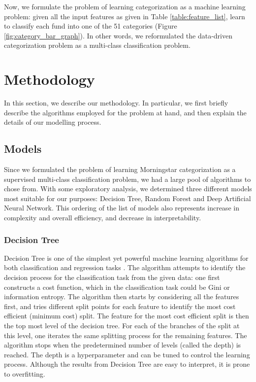 \documentclass[sigconf]{acmart}
\begin{document}
Now, we formulate the problem of learning categorization as a machine learning problem: given all the input features as given in Table \ref{table:feature_list}, learn to classify each fund into one of the 51 categories (Figure \ref{fig:category_bar_graph}). In other words, we reformulated the data-driven categorization problem as a multi-class classification problem.

\section{Methodology}
In this section, we describe our methodology. In particular, we first briefly describe the algorithms employed for the problem at hand, and then explain the details of our modelling process. 
\subsection{Models}
Since we formulated the problem of learning Morningstar categorization as a supervised multi-class classification problem, we had a large pool of algorithms to chose from. With some exploratory analysis, we determined three different models most suitable for our purposes: Decision Tree, Random Forest and Deep Artificial Neural Network. This ordering of the list of models also represents increase in complexity and overall efficiency, and decrease in interpretability.

\subsubsection{Decision Tree}
Decision Tree is one of the simplest yet powerful machine learning algorithms for both classification and regression tasks \cite{hastie2009elements}. The algorithm attempts to identify the decision process for the classification task from the given data: one first constructs a cost function, which in the classification task could be Gini or information entropy. The algorithm then starts by considering all the features first, and tries different split points for each feature to identify the most cost efficient (minimum cost) split. The feature for the most cost efficient split is then the top most level of the decision tree. For each of the branches of the split at this level, one iterates the same splitting process for the remaining features. The algorithm stops when the predetermined number of levels (called the depth) is reached. The depth is a hyperparameter and can be tuned to control the learning process. Although the results from Decision Tree are easy to interpret, it is prone to overfitting.
\end{document}
